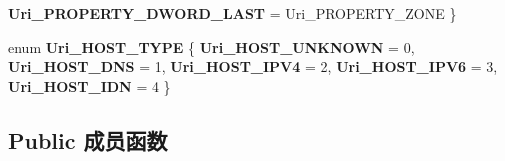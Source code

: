 \begin{DoxyCompactItemize}
{\bfseries Uri\+\_\+\+P\+R\+O\+P\+E\+R\+T\+Y\+\_\+\+D\+W\+O\+R\+D\+\_\+\+L\+A\+ST} = Uri\+\_\+\+P\+R\+O\+P\+E\+R\+T\+Y\+\_\+\+Z\+O\+NE
 \}
\item 
\mbox{\label{interface_i_uri_ae2c49caf4139f9fd2fd24f474c1674d2}} 
enum {\bfseries Uri\+\_\+\+H\+O\+S\+T\+\_\+\+T\+Y\+PE} \{ \newline
{\bfseries Uri\+\_\+\+H\+O\+S\+T\+\_\+\+U\+N\+K\+N\+O\+WN} = 0, 
{\bfseries Uri\+\_\+\+H\+O\+S\+T\+\_\+\+D\+NS} = 1, 
{\bfseries Uri\+\_\+\+H\+O\+S\+T\+\_\+\+I\+P\+V4} = 2, 
{\bfseries Uri\+\_\+\+H\+O\+S\+T\+\_\+\+I\+P\+V6} = 3, 
\newline
{\bfseries Uri\+\_\+\+H\+O\+S\+T\+\_\+\+I\+DN} = 4
 \}
\end{DoxyCompactItemize}
\subsection*{Public 成员函数}
